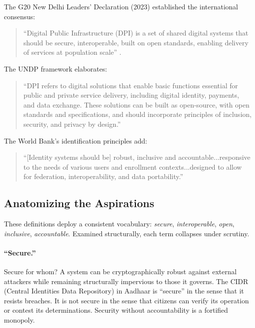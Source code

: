\documentclass{article}
\begin{document}
The G20 New Delhi Leaders' Declaration (2023) established the international consensus:

\begin{quote}
``Digital Public Infrastructure (DPI) is a set of shared digital systems that should be secure, interoperable, built on open standards, enabling delivery of services at population scale'' \citep{g20}.
\end{quote}

The UNDP framework \citep{undp} elaborates:

\begin{quote}
``DPI refers to digital solutions that enable basic functions essential for public and private service delivery, including digital identity, payments, and data exchange. These solutions can be built as open-source, with open standards and specifications, and should incorporate principles of inclusion, security, and privacy by design.''
\end{quote}

The World Bank's identification principles add:

\begin{quote}
``[Identity systems should be] robust, inclusive and accountable...responsive to the needs of various users and enrollment contexts...designed to allow for federation, interoperability, and data portability.''
\end{quote}

\subsection{Anatomizing the Aspirations}

These definitions deploy a consistent vocabulary: \textit{secure}, \textit{interoperable}, \textit{open}, \textit{inclusive}, \textit{accountable}. Examined structurally, each term collapses under scrutiny.

\paragraph{``Secure.''}  Secure for whom? A system can be cryptographically robust against external attackers while remaining structurally impervious to those it governs. The CIDR (Central Identities Data Repository) in Aadhaar is ``secure'' in the sense that it resists breaches. It is not secure in the sense that citizens can verify its operation or contest its determinations. Security without accountability is a fortified monopoly.
\end{document}
